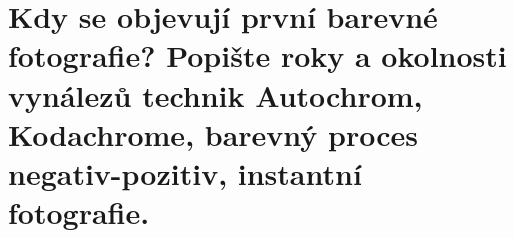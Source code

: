 \section{Kdy se objevují první barevné fotografie? Popište roky a okolnosti vynálezů technik Autochrom, Kodachrome, 
barevný proces negativ-pozitiv, instantní fotografie.}